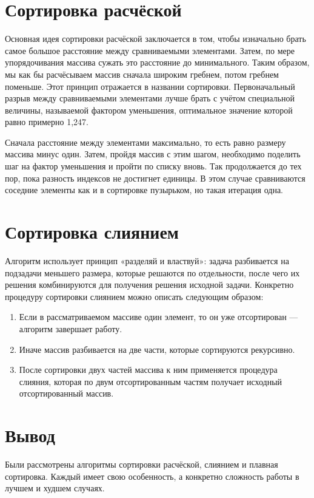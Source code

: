 	\section{Сортировка расчёской}
	\par Основная идея сортировки расчёской заключается в том, чтобы изначально брать самое большое расстояние между сравниваемыми элементами. Затем, по мере упорядочивания массива сужать это расстояние до минимального. Таким образом, мы как бы расчёсываем массив сначала широким гребнем, потом гребнем поменьше. Этот принцип отражается в названии сортировки. Первоначальный разрыв между сравниваемыми элементами лучше брать с учётом специальной величины, называемой фактором уменьшения, оптимальное значение которой равно примерно 1,247.
	\par Сначала расстояние между элементами максимально, то есть равно размеру массива минус один. Затем, пройдя массив с этим шагом, необходимо поделить шаг на фактор уменьшения и пройти по списку вновь. Так продолжается до тех пор, пока разность индексов не достигнет единицы. В этом случае сравниваются соседние элементы как и в сортировке пузырьком, но такая итерация одна.
	\section{Сортировка слиянием}
	\par Алгоритм использует принцип «разделяй и властвуй»: задача разбивается на подзадачи меньшего размера, которые решаются по отдельности, после чего их решения комбинируются для получения решения исходной задачи. Конкретно процедуру сортировки слиянием можно описать следующим образом:
	\begin{enumerate}
		\item Если в рассматриваемом массиве один элемент, то он уже отсортирован — алгоритм завершает работу.
		\item Иначе массив разбивается на две части, которые сортируются рекурсивно.
		\item После сортировки двух частей массива к ним применяется процедура слияния, которая по двум отсортированным частям получает исходный отсортированный массив.
	\end{enumerate}
	\section*{Вывод}
\par Были рассмотрены алгоритмы сортировки расчёской, слиянием и плавная сортировка. Каждый имеет свою особенность, а конкретно сложность работы в лучшем и худшем случаях.
\newpage